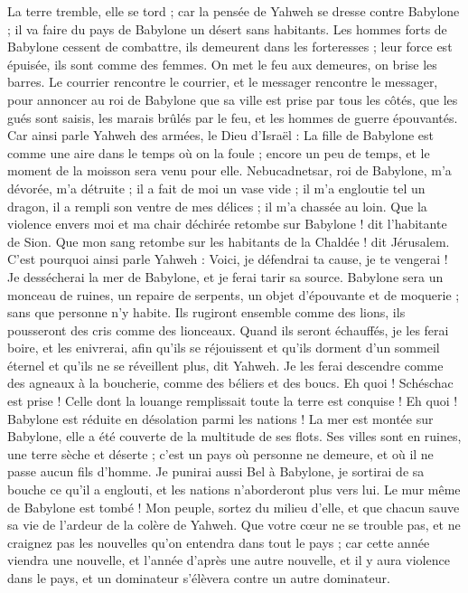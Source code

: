\begin{multicols}{2}
La terre tremble, elle se tord ; car la pensée de Yahweh se dresse contre Babylone ; il va faire du pays de Babylone un désert sans habitants.
Les hommes forts de Babylone cessent de combattre, ils demeurent dans les forteresses ; leur force est épuisée, ils sont comme des femmes. On met le feu aux demeures, on brise les barres.
Le courrier rencontre le courrier, et le messager rencontre le messager, pour annoncer au roi de Babylone que sa ville est prise par tous les côtés,
que les gués sont saisis, les marais brûlés par le feu, et les hommes de guerre épouvantés.
Car ainsi parle Yahweh des armées, le Dieu d'Israël : La fille de Babylone est comme une aire dans le temps où on la foule ; encore un peu de temps, et le moment de la moisson sera venu pour elle.
Nebucadnetsar, roi de Babylone, m'a dévorée, m'a détruite ; il a fait de moi un vase vide ; il m'a engloutie tel un dragon, il a rempli son ventre de mes délices ; il m'a chassée au loin.
Que la violence envers moi et ma chair déchirée retombe sur Babylone ! dit l'habitante de Sion. Que mon sang retombe sur les habitants de la Chaldée ! dit Jérusalem.
C'est pourquoi ainsi parle Yahweh : Voici, je défendrai ta cause, je te vengerai ! Je dessécherai la mer de Babylone, et je ferai tarir sa source.
Babylone sera un monceau de ruines, un repaire de serpents, un objet d’épouvante et de moquerie ; sans que personne n'y habite.
Ils rugiront ensemble comme des lions, ils pousseront des cris comme des lionceaux.
Quand ils seront échauffés, je les ferai boire, et les enivrerai, afin qu'ils se réjouissent et qu'ils dorment d'un sommeil éternel et qu'ils ne se réveillent plus, dit Yahweh.
Je les ferai descendre comme des agneaux à la boucherie, comme des béliers et des boucs.
Eh quoi ! Schéschac est prise ! Celle dont la louange remplissait toute la terre est conquise ! Eh quoi ! Babylone est réduite en désolation parmi les nations !
La mer est montée sur Babylone, elle a été couverte de la multitude de ses flots.
Ses villes sont en ruines, une terre sèche et déserte ; c'est un pays où personne ne demeure, et où il ne passe aucun fils d'homme.
Je punirai aussi Bel à Babylone, je sortirai de sa bouche ce qu'il a englouti, et les nations n'aborderont plus vers lui. Le mur même de Babylone est tombé !
Mon peuple, sortez du milieu d'elle, et que chacun sauve sa vie de l'ardeur de la colère de Yahweh.
Que votre cœur ne se trouble pas, et ne craignez pas les nouvelles qu'on entendra dans tout le pays ; car cette année viendra une nouvelle, et l'année d'après une autre nouvelle, et il y aura violence dans le pays, et un dominateur s'élèvera contre un autre dominateur.

\end{multicols}
